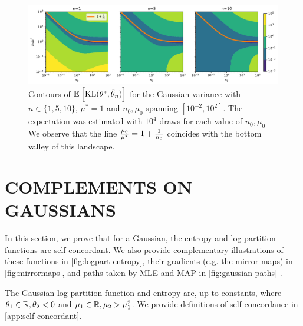 \begin{figure}[ht]
	\centering
	\includegraphics[width=\textwidth]{figs/optimal_n0.pdf}
	\caption{Contours of $\mathbb{E}_{} \left[ \mathrm{KL}(\theta^*, \hat {\theta}_n) \right] $  for the Gaussian variance with $n\in\{1,5,10\}$, $\mu^*=1$ and $n_0, \mu_0$ spanning $[10^{-2}, 10^2]$. The expectation was estimated with $10^4$ draws for each value of $n_0, \mu_0$ We observe that the line $\frac{\mu_0}{\mu^*} = 1 + \frac{1}{n_0}$ coincides with the bottom valley of this landscape.
	}
	\label{fig:optimal_n0}
\end{figure}


\section{COMPLEMENTS ON GAUSSIANS}
\label{app:gaussian}


In this section, we prove that for a Gaussian, the entropy and log-partition functions are self-concordant.
We also provide complementary illustrations of 
these functions in \cref{fig:logpart-entropy}, 
their gradients (e.g. the mirror maps) in \cref{fig:mirrormaps},
and paths taken by MLE and MAP in \cref{fig:gaussian-paths} .

The Gaussian log-partition function and entropy are, up to constants,
where $\theta_1\in\mathbb{R}, \theta_2 <0$ and $\mu_1\in\mathbb{R}, \mu_2>\mu_1^2$.
We provide definitions of self-concordance in \cref{app:self-concordant}.

